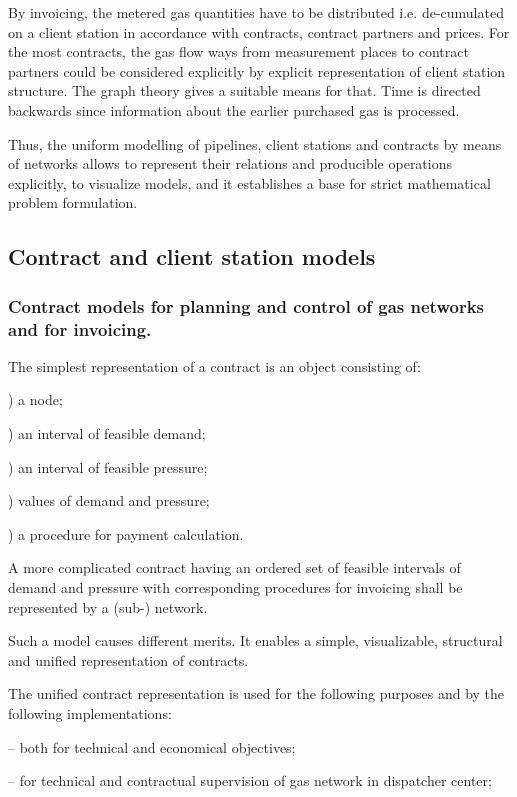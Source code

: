 \documentclass{article}
\begin{document}
By invoicing, the metered gas quantities have to be distributed i.e.
de-cumulated on a client station in accordance with contracts, contract
partners and prices. For the most contracts, the gas flow ways from
measurement places to contract partners could be considered explicitly by
explicit representation of client station structure. The graph theory gives
a suitable means for that. Time is directed backwards since information
about the earlier purchased gas is processed.

Thus, the uniform modelling of pipelines, client stations and contracts by
means of networks allows to represent their relations and producible
operations explicitly, to visualize models, and it establishes a base for
strict mathematical problem formulation.

\subsection{Contract and client station models}

\subsubsection{Contract models for planning and control of gas networks and
for invoicing.}

The simplest representation of a contract is an object consisting of:

) a node;

) an interval of feasible demand;

) an interval of feasible pressure;

) values of demand and pressure;

) a procedure for payment calculation.

A more complicated contract having an ordered set of feasible intervals of
demand and pressure with corresponding procedures for invoicing shall be
represented by a (sub-) network.

Such a model causes different merits. It enables a simple, visualizable,
structural and unified representation of contracts.

The unified contract representation is used for the following purposes and
by the following implementations:

\qquad -- both for technical and economical objectives;

\qquad -- for technical and contractual supervision of gas network in
dispatcher center;
\end{document}
